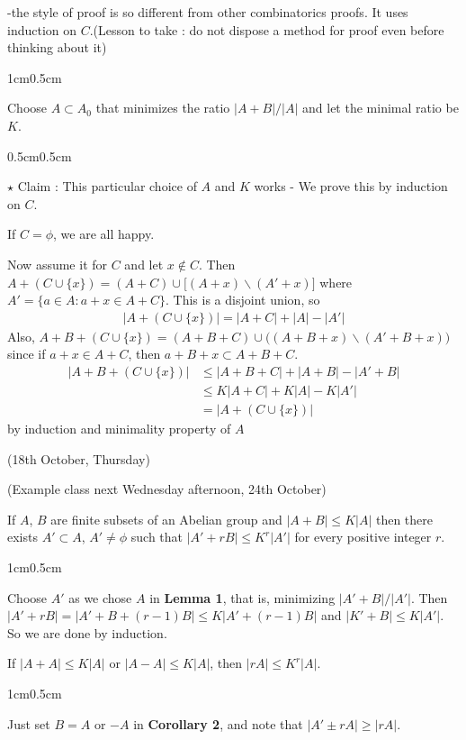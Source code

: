 \documentclass[10pt,a4paper]{report}
\newenvironment{proof}
{\begin{changemargin}{1cm}{0.5cm}
	}%
	{\end{changemargin}
}
\newenvironment{subproof}
{\begin{changemargin}{0.5cm}{0.5cm}
	}%
	{\end{changemargin}
}
\begin{document}
-the style of proof is so different from other combinatorics proofs. It uses induction on $C$.(Lesson to take : do not dispose a method for proof even before thinking about it)
\begin{proof}
\pf Choose $A \subset A_0$ that minimizes the ratio $|A+B|/|A|$ and let the minimal ratio be $K$.

\begin{subproof}
$\star$ Claim : This particular choice of $A$ and $K$ works - We prove this by induction on $C$.

\pf If $C=\phi$, we are all happy.

Now assume it for $C$ and let $x\notin C$. Then $A+(C \cup \{x\}) = (A+C) \cup \Big[ (A+x) \backslash (A'+x) \Big]$ where $A' = \{a\in A: a+x\in A+ C\}$. This is a disjoint union, so
\begin{align*}
|A+(C\cup \{x\})| = |A+C| + |A| - |A'|
\end{align*}
Also, $A+B + (C\cup \{x\}) = (A+B+C) \cup \big( (A+B+x) \backslash (A'+B+x)\big)$ since if $a+x\in A+C$, then $a+B+x \subset A+B+C$.
\begin{align*}
|A+B+(C\cup \{x \}) | &\leq |A+B+C| + |A+B| - |A'+B| \\
&\leq K|A+C| + K|A| - K|A'| \\
& = |A+(C\cup \{x\})|
\end{align*}
by induction and minimality property of $A$
\end{subproof}

\eop
\end{proof}
\s

\newday

(18th October, Thursday)
\s

(Example class next Wednesday afternoon, 24th October)
\s

 If $A$, $B$ are finite subsets of an Abelian group and $|A+ B|\leq K|A|$ then there exists $A' \subset A$, $A' \neq \phi$ such that $|A' + rB| \leq K^r|A'|$ for every positive integer $r$.
\begin{proof}
\pf Choose $A'$ as we chose $A$ in \textbf{Lemma 1}, that is, minimizing $|A'+B|/|A'|$. Then $|A' + rB| = |A'+B +(r-1)B| \leq K |A' + (r-1)B|$ and $|K' + B| \leq K|A'|$. So we are done by induction.

\eop
\end{proof}
\s

 If $|A+A| \leq K|A|$ or $|A-A| \leq K|A|$, then $|rA| \leq K^r |A|$.
\begin{proof}
\pf Just set $B= A$ or $-A$ in \textbf{Corollary 2}, and note that $|A' \pm rA| \geq |rA|$.

\eop
\end{proof}
\s
\end{document}
